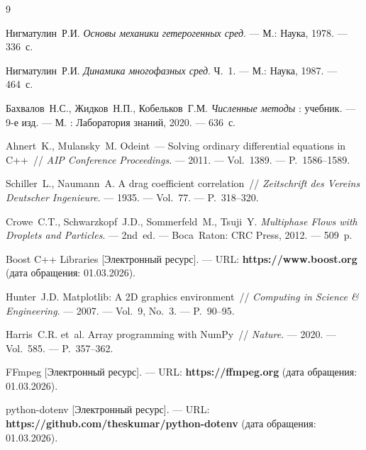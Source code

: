 \documentclass[14pt,a4paper]{extarticle}
\numberwithin{figure}{section}
\numberwithin{table}{section}
\begin{document}
\newpage
\begingroup
{}
\begin{thebibliography}{9}
\setlength{\itemsep}{0.2em}
\setlength{\parskip}{0pt}

Нигматулин~Р.И.
\textit{Основы механики гетерогенных сред}.
--- М.: Наука, 1978. --- 336~с.

Нигматулин~Р.И.
\textit{Динамика многофазных сред}. Ч.~1.
--- М.: Наука, 1987. --- 464~с.

Бахвалов~Н.С., Жидков~Н.П., Кобельков~Г.М.
\textit{Численные методы} : учебник.
--- 9-е изд. --- М. : Лаборатория знаний, 2020. --- 636~с.

Ahnert~K., Mulansky~M.
Odeint~--- Solving ordinary differential equations in C++~//
\textit{AIP Conference Proceedings}.
--- 2011. --- Vol.~1389. --- P.~1586--1589.

Schiller~L., Naumann~A.
A drag coefficient correlation~//
\textit{Zeitschrift des Vereins Deutscher Ingenieure}.
--- 1935. --- Vol.~77. --- P.~318--320.

Crowe~C.T., Schwarzkopf~J.D., Sommerfeld~M., Tsuji~Y.
\textit{Multiphase Flows with Droplets and Particles}.
--- 2nd~ed. --- Boca~Raton: CRC Press, 2012. --- 509~p.

Boost C++ Libraries [Электронный ресурс].
--- URL: \textbf{https://www.boost.org} (дата обращения: 01.03.2026).

Hunter~J.D.
Matplotlib: A 2D graphics environment~//
\textit{Computing in Science \& Engineering}.
--- 2007. --- Vol.~9, No.~3. --- P.~90--95.

Harris~C.R. et~al.
Array programming with NumPy~//
\textit{Nature}.
--- 2020. --- Vol.~585. --- P.~357--362.

FFmpeg [Электронный ресурс].
--- URL: \textbf{https://ffmpeg.org} (дата обращения: 01.03.2026).

python-dotenv [Электронный ресурс].
--- URL: \textbf{https://github.com/theskumar/python-dotenv}
(дата обращения: 01.03.2026).
\end{thebibliography}
\endgroup
\end{document}
